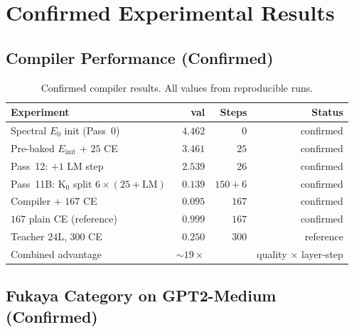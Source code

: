 \documentclass[11pt]{amsart}
\begin{document}
\section{Confirmed Experimental Results}
\label{sec:results}

\subsection{Compiler Performance (Confirmed)}

\begin{table}[htbp]
\centering\small
\caption{Confirmed compiler results. All values from reproducible runs.}
\label{tab:performance}
\begin{tabular}{lrrr}
\toprule
\textbf{Experiment} & \textbf{val} & \textbf{Steps} & \textbf{Status} \\
\midrule
Spectral $E_0$ init (Pass~0)             & $4.462$  & $0$    & confirmed \\
Pre-baked $E_\mathrm{init}$ + $25$ CE    & $3.461$  & $25$   & confirmed \\
Pass~12: $+1$ LM step                    & $2.539$  & $26$   & confirmed \\
Pass~11B: K$_0$ split $6\times(25+\mathrm{LM})$ & $0.139$ & $150+6$ & confirmed \\
Compiler + $167$ CE                      & $0.095$  & $167$  & confirmed \\
$167$ plain CE (reference)               & $0.999$  & $167$  & confirmed \\
Teacher $24$L, $300$ CE                  & $0.250$  & $300$  & reference \\
\midrule
Combined advantage                       & $\sim\!19\times$ & & quality $\times$ layer-step \\
\bottomrule
\end{tabular}
\end{table}

\subsection{Fukaya Category on GPT2-Medium (Confirmed)}
\end{document}
